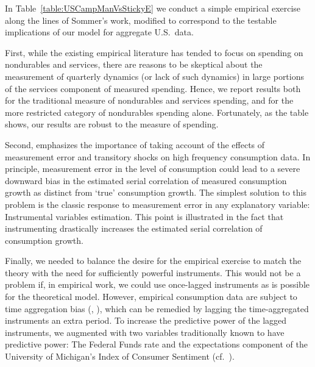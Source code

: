 \documentclass[titlepage]{./econtex}
\begin{document}
In Table~\ref{table:USCampManVsStickyE} we conduct a simple empirical exercise along the lines of Sommer's work, modified to correspond to the testable implications of our model for aggregate U.S.\ data.

First, while the existing empirical literature has tended to focus on spending on nondurables and services, there are reasons to be skeptical about the measurement of quarterly dynamics (or lack of such dynamics) in large portions of the services component of measured spending.
Hence, we report results both for the traditional measure of nondurables and services spending, and for the more restricted category of nondurables spending alone.  Fortunately, as the table shows, our results are robust to the measure of spending. 

Second, \cite{som07} emphasizes the importance of taking account of the effects of measurement error and transitory shocks on high frequency consumption data.  In principle, measurement error in the level of consumption could lead to a severe downward bias in the estimated serial correlation of measured consumption growth as distinct from `true' consumption growth.  The simplest solution to this problem is the classic response to measurement error in any explanatory variable: Instrumental variables estimation.  This point is illustrated in the fact that instrumenting drastically increases the estimated serial correlation of consumption growth.

Finally, we needed to balance the desire for the empirical exercise to match the theory with the need for sufficiently powerful instruments.  This would not be a problem if, in empirical work, we could use once-lagged instruments as is possible for the theoretical model.  However, empirical consumption data are subject to time aggregation bias (\cite{workingTimeAgg}, \cite{cmModel}), which can be remedied by lagging the time-aggregated instruments an extra period.  To increase the predictive power of the lagged instruments, we augmented with two variables traditionally known to have predictive power: The Federal Funds rate and the expectations component of the University of Michigan's Index of Consumer Sentiment (cf.\ \cite{cfwSentiment}). 
\end{document}
